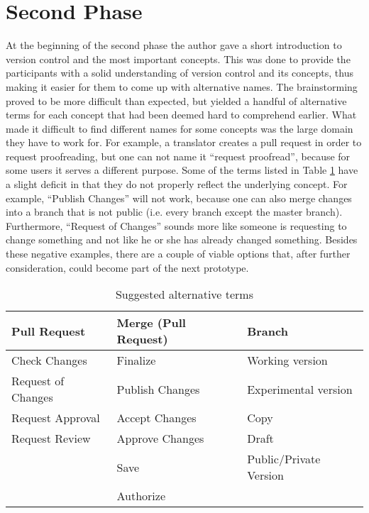 
\section{Second Phase}
At the beginning of the second phase the author gave a short introduction to version control and the most important concepts. This was done to provide the participants with a solid understanding of version control and its concepts, thus making it easier for them to come up with alternative names. The brainstorming proved to be more difficult than expected, but yielded a handful of alternative terms for each concept that had been deemed hard to comprehend earlier. What made it difficult to find different names for some concepts was the large domain they have to work for. For example, a translator creates a pull request in order to request proofreading, but one can not name it “request proofread”, because for some users it serves a different purpose. Some of the terms listed in Table \ref{table:alt-terminology} have a slight deficit in that they do not properly reflect the underlying concept. For example, “Publish Changes” will not work, because one can also merge changes into a branch that is not public (i.e. every branch except the master branch). Furthermore, “Request of Changes” sounds more like someone is requesting to change something and not like he or she has already changed something. Besides these negative examples, there are a couple of viable options that, after further consideration, could become part of the next prototype.

\begin{table}[h!]
\begin{tabular}{|l|l|l|}
\hline
\rowcolor[HTML]{EFEFEF}
{\bf Pull Request} & {\bf Merge (Pull Request)} & {\bf Branch}           \\ \hline
Check Changes      & Finalize                   & Working version        \\
Request of Changes & Publish Changes            & Experimental version   \\
Request Approval   & Accept Changes             & Copy                   \\
Request Review     & Approve Changes            & Draft                  \\
                   & Save                       & Public/Private Version \\
                   & Authorize                  &                        \\ \hline
\end{tabular}
\centering
\caption{Suggested alternative terms}
\label{table:alt-terminology}
\end{table}

